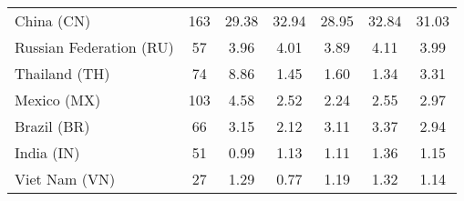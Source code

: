 \begin{table}[h!]
{\begin{tabular}{lcccccc}
    China (CN) & \color{black} 163 & {\cellcolor[HTML]{EDF4FC}} \color[HTML]{000000} \color{black} 29.38 & {\cellcolor[HTML]{6CAED6}} \color[HTML]{F1F1F1} \color{black} 32.94 & {\cellcolor[HTML]{F7FBFF}} \color[HTML]{000000} \color{black} 28.95 & {\cellcolor[HTML]{71B1D7}} \color[HTML]{F1F1F1} \color{black} 32.84 & \color{black} 31.03 \\
Russian Federation (RU) & \color{black} 57 & {\cellcolor[HTML]{D8E7F5}} \color[HTML]{000000} \color{black} 3.96 & {\cellcolor[HTML]{BFD8ED}} \color[HTML]{000000} \color{black} 4.01 & {\cellcolor[HTML]{F7FBFF}} \color[HTML]{000000} \color{black} 3.89 & {\cellcolor[HTML]{6CAED6}} \color[HTML]{F1F1F1} \color{black} 4.11 & \color{black} 3.99 \\
Thailand (TH) & \color{black} 74 & {\cellcolor[HTML]{6AAED6}} \color[HTML]{F1F1F1} \color{black} 8.86 & {\cellcolor[HTML]{F6FAFF}} \color[HTML]{000000} \color{black} 1.45 & {\cellcolor[HTML]{F4F9FE}} \color[HTML]{000000} \color{black} 1.60 & {\cellcolor[HTML]{F7FBFF}} \color[HTML]{000000} \color{black} 1.34 & \color{black} 3.31 \\
Mexico (MX) & \color{black} 103 & {\cellcolor[HTML]{6AAED6}} \color[HTML]{F1F1F1} \color{black} 4.58 & {\cellcolor[HTML]{EBF3FB}} \color[HTML]{000000} \color{black} 2.52 & {\cellcolor[HTML]{F7FBFF}} \color[HTML]{000000} \color{black} 2.24 & {\cellcolor[HTML]{EAF3FB}} \color[HTML]{000000} \color{black} 2.55 & \color{black} 2.97 \\
Brazil (BR) & \color{black} 66 & {\cellcolor[HTML]{8DC1DD}} \color[HTML]{000000} \color{black} 3.15 & {\cellcolor[HTML]{F7FBFF}} \color[HTML]{000000} \color{black} 2.12 & {\cellcolor[HTML]{95C5DF}} \color[HTML]{000000} \color{black} 3.11 & {\cellcolor[HTML]{6AAED6}} \color[HTML]{F1F1F1} \color{black} 3.37 & \color{black} 2.94 \\
India (IN) & \color{black} 51 & {\cellcolor[HTML]{F7FBFF}} \color[HTML]{000000} \color{black} 0.99 & {\cellcolor[HTML]{D3E3F3}} \color[HTML]{000000} \color{black} 1.13 & {\cellcolor[HTML]{D6E5F4}} \color[HTML]{000000} \color{black} 1.11 & {\cellcolor[HTML]{6AAED6}} \color[HTML]{F1F1F1} \color{black} 1.36 & \color{black} 1.15 \\
Viet Nam (VN) & \color{black} 27 & {\cellcolor[HTML]{77B5D9}} \color[HTML]{000000} \color{black} 1.29 & {\cellcolor[HTML]{F7FBFF}} \color[HTML]{000000} \color{black} 0.77 & {\cellcolor[HTML]{9CC9E1}} \color[HTML]{000000} \color{black} 1.19 & {\cellcolor[HTML]{6AAED6}} \color[HTML]{F1F1F1} \color{black} 1.32 & \color{black} 1.14 \\

\end{tabular}}
\end{table}
